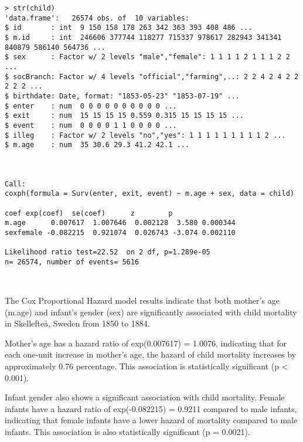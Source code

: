 \documentclass[12pt,letterpaper]{article}
\begin{document}
\newpage	
\begin{verbatim}
> str(child)
'data.frame':	26574 obs. of  10 variables:
$ id       : int  9 150 158 178 263 342 363 393 408 486 ...
$ m.id     : int  246606 377744 118277 715337 978617 282943 341341 840879 586140 564736 ...
$ sex      : Factor w/ 2 levels "male","female": 1 1 1 1 2 1 1 1 2 2 ...
$ socBranch: Factor w/ 4 levels "official","farming",..: 2 2 4 2 4 2 2 2 2 2 ...
$ birthdate: Date, format: "1853-05-23" "1853-07-19" ...
$ enter    : num  0 0 0 0 0 0 0 0 0 0 ...
$ exit     : num  15 15 15 15 0.559 0.315 15 15 15 15 ...
$ event    : num  0 0 0 0 1 1 0 0 0 0 ...
$ illeg    : Factor w/ 2 levels "no","yes": 1 1 1 1 1 1 1 1 1 2 ...
$ m.age    : num  35 30.6 29.3 41.2 42.1 ...



Call:
coxph(formula = Surv(enter, exit, event) ~ m.age + sex, data = child)

coef exp(coef)  se(coef)      z        p
m.age      0.007617  1.007646  0.002128  3.580 0.000344
sexfemale -0.082215  0.921074  0.026743 -3.074 0.002110

Likelihood ratio test=22.52  on 2 df, p=1.289e-05
n= 26574, number of events= 5616 



\end{verbatim}	

The Cox Proportional Hazard model results indicate that both mother's age (m.age) and infant's gender (sex) are significantly associated with child mortality in Skellefteå, Sweden from 1850 to 1884.

Mother's age has a hazard ratio of exp(0.007617) = 1.0076, indicating that for each one-unit increase in mother's age, the hazard of child mortality increases by approximately 0.76 percentage. This association is statistically significant (p < 0.001).

Infant gender also shows a significant association with child mortality. Female infants have a hazard ratio of exp(-0.082215) = 0.9211 compared to male infants, indicating that female infants have a lower hazard of mortality compared to male infants. This association is also statistically significant (p = 0.0021).
\end{document}
